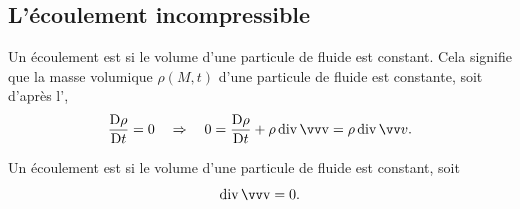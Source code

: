 \documentclass[12pt,fancy]{cours}
\begin{document}



\subsection{L'écoulement incompressible}

Un écoulement est  si le volume d'une particule de fluide est constant. Cela signifie que la masse volumique $\rho(M,t)$ d'une particule de fluide est constante, soit d'après l',
$$
\Dt{\rho} = 0 \Rar 0 = \frac{\mathrm{D}\rho}{\mathrm{D} t} + \rho\,\Dive{\Vec{v}} = \rho \,\dive \Vec{v}.
$$



\begin{definition}\label{def:icom}
Un écoulement est  si le volume d'une particule de fluide est constant, soit
\begin{equation*}
\Dive{\Vec{v}}=0.
\end{equation*}
\end{definition}
\end{document}
